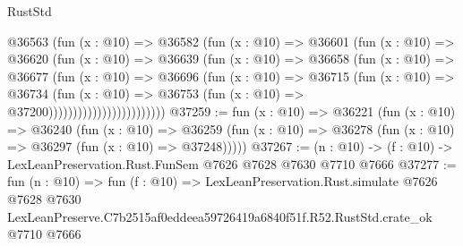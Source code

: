 \begin{lexlean}{RustStd}
\begin{coremodule}
                            @36563
                              (fun (x : @10) =>
                              @36582
                                (fun (x : @10) =>
                                @36601
                                  (fun (x : @10) =>
                                  @36620
                                    (fun (x : @10) =>
                                    @36639
                                      (fun (x : @10) =>
                                      @36658
                                        (fun (x : @10) =>
                                        @36677
                                          (fun (x : @10) =>
                                          @36696
                                            (fun (x : @10) =>
                                            @36715
                                              (fun (x : @10) =>
                                              @36734
                                                (fun (x : @10) =>
                                                @36753
                                                  (fun (x : @10) => @37200))))))))))))))))))))))))
@37259 := fun (x : @10) =>
  @36221
    (fun (x : @10) =>
    @36240
      (fun (x : @10) =>
      @36259 (fun (x : @10) => @36278 (fun (x : @10) => @36297 (fun (x : @10) => @37248)))))
@37267 := (n : @10) -> (f : @10) -> LexLeanPreservation.Rust.FunSem @7626 @7628 @7630 @7710 @7666
@37277 := fun (n : @10) =>
  fun (f : @10) =>
  LexLeanPreservation.Rust.simulate
    @7626
    @7628
    @7630
    LexLeanPreserve.C7b2515af0eddeea59726419a6840f51f.R52.RustStd.crate_ok
    @7710
    @7666
\end{coremodule}
\end{lexlean}
